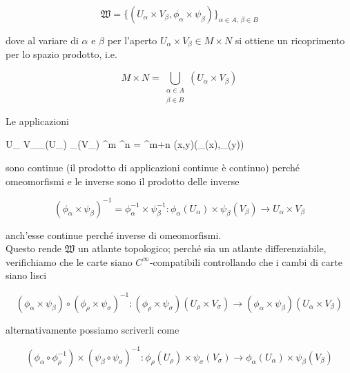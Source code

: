\begin{equation}
	\mathfrak{W} = \{(U_{\alpha} \times V_{\beta},\phi_{\alpha} \times \psi_{\beta})\}_{\alpha \in A, \, \beta \in B}
\end{equation}

dove al variare di $ \alpha $ e $ \beta $ per l'aperto $ U_{\alpha} \times V_{\beta} \in M \times N $ si ottiene un ricoprimento per lo spazio prodotto, i.e.

\begin{equation}
	M \times N = \bigcup_{\substack{ \alpha \in A \\ \beta \in B }} (U_{\alpha} \times V_{\beta})
\end{equation}

Le applicazioni

\map{\phi_{\alpha} \times \psi_{\beta}}
	{U_{\alpha} \times V_{\beta}}{\phi_{\alpha}(U_{\alpha}) \times \psi_{\beta}(V_{\beta}) \subset \R^{m} \times \R^{n} = \R^{m+n}}
	{(x,y)}{(\phi_{\alpha}(x),\psi_{\beta}(y))}

sono continue (il prodotto di applicazioni continue è continuo) perché omeomorfismi e le inverse sono il prodotto delle inverse

\begin{equation}
	(\phi_{\alpha} \times \psi_{\beta})^{-1} = \phi_{\alpha}^{-1} \times \psi_{\beta}^{-1} : \phi_{\alpha}(U_{\alpha}) \times \psi_{\beta}(V_{\beta}) \to U_{\alpha} \times V_{\beta}
\end{equation}

anch'esse continue perché inverse di omeomorfismi.\\
Questo rende $ \mathfrak{W} $ un atlante topologico; perché sia un atlante differenziabile, verifichiamo che le carte siano $ C^{\infty} $-compatibili controllando che i cambi di carte siano lisci

\begin{equation}
	(\phi_{\alpha} \times \psi_{\beta}) \circ (\phi_{\rho} \times \psi_{\sigma})^{-1} : (\phi_{\rho} \times \psi_{\sigma})(U_{\rho} \times V_{\sigma}) \to (\phi_{\alpha} \times \psi_{\beta})(U_{\alpha} \times V_{\beta})
\end{equation}

alternativamente possiamo scriverli come

\begin{equation}
	(\phi_{\alpha} \circ \phi_{\rho}^{-1}) \times (\psi_{\beta} \circ \psi_{\sigma})^{-1} : \phi_{\rho}(U_{\rho}) \times \psi_{\sigma}(V_{\sigma}) \to \phi_{\alpha}(U_{\alpha}) \times \psi_{\beta}(V_{\beta})
\end{equation}


